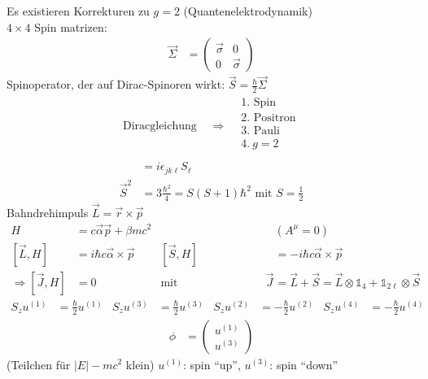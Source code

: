 Es existieren Korrekturen zu $g=2$ (Quantenelektrodynamik)\\
$4\times4$ Spin matrizen:
	\begin{align*}
		\vec{\Sigma} &=
		\begin{pmatrix}
			\vec{\sigma} & 0 \\
			0 & \vec{\sigma} 
		\end{pmatrix}
	\end{align*}
Spinoperator, der auf Dirac-Spinoren wirkt: $\vec{S} = \frac{\hbar}{2} \vec{\Sigma}$
	\begin{align*}
		\text{Diracgleichung } &\Rightarrow
		\begin{aligned}
			&1.\text{ Spin} \\
			&2.\text{ Positron} \\
			&3.\text{ Pauli} \\
			&4. ~g=2 \\
		\end{aligned}
	\end{align*}
	\begin{align*}
		[S_j,S_k] &= i\epsilon_{jk \ell} S_\ell \\
		\vec{S}^2 &= 3 \frac{\hbar^2}{4} =
		S(S + 1) \hbar^2 \text{ mit } S=\frac{1}{2}
	\end{align*}
Bahndrehimpuls $\vec{L} = \vec{r} \times \vec{p}$
	\begin{align*}
		H &= c \vec{\alpha} \vec{p} + \beta mc^2 & &(A^\mu = 0) \\
		[\vec{L}, H] &= i\hbar c \vec{\alpha} \times \vec{p}
		& [\vec{S}, H] &= -i\hbar c \vec{\alpha} \times \vec{p} \\
		\Rightarrow [\vec{J}, H] &= 0
		& \text{mit Gesamtdrehimpuls } 
		\vec{J} &= \vec{L} + \vec{S} = \vec{L} \otimes \mathds{1}_4 + \mathds{1}_{2\ell} \otimes \vec{S}
	\end{align*}
	\begin{align*}
		S_z u^{(1)} &= \frac{\hbar}{2} u^{(1)} &
		S_z u^{(3)} &= \frac{\hbar}{2} u^{(3)} &
		S_z u^{(2)} &= -\frac{\hbar}{2} u^{(2)} &
		S_z u^{(4)} &= -\frac{\hbar}{2} u^{(4)}
	\end{align*}
	\begin{align*}
		\phi &= 
		\begin{pmatrix}
			u^{(1)} \\
			u^{(3)}
		\end{pmatrix}
	\end{align*}
(Teilchen für $|E| - mc^2$ klein) $u^{(1)}$: spin ``up'', $u^{(3)}$: spin ``down'' 